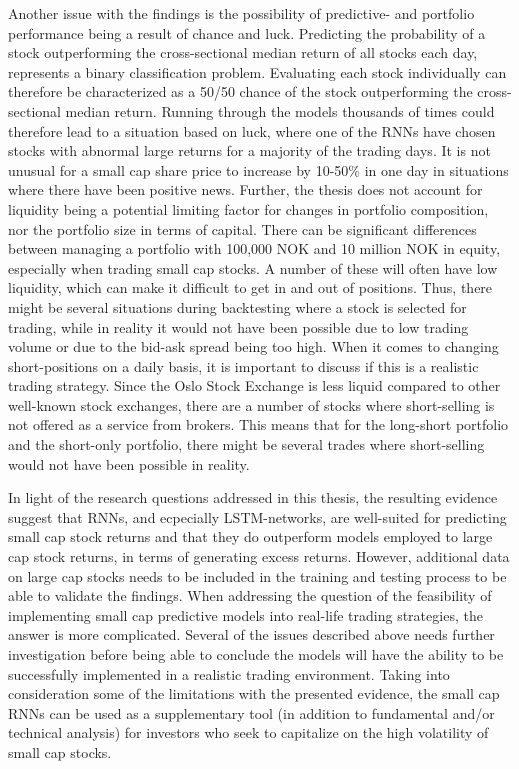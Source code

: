 \indent\newline
Another issue with the findings is the possibility of predictive- and portfolio performance being a result of chance and luck. Predicting the probability of a stock outperforming the cross-sectional median return of all stocks each day, represents a binary classification problem. Evaluating each stock individually can therefore be characterized as a 50/50 chance of the stock outperforming the cross-sectional median return. Running through the models thousands of times could therefore lead to a situation based on luck, where one of the RNNs have chosen stocks with abnormal large returns for a majority of the trading days. It is not unusual for a small cap share price to increase by 10-50\% in one day in situations where there have been positive news. Further, the thesis does not account for liquidity being a potential limiting factor for changes in portfolio composition, nor the portfolio size in terms of capital. There can be significant differences between managing a portfolio with 100,000 NOK and 10 million NOK in equity, especially when trading small cap stocks. A number of these will often have low liquidity, which can make it difficult to get in and out of positions. Thus, there might be several situations during backtesting where a stock is selected for trading, while in reality it would not have been possible due to low trading volume or due to the bid-ask spread being too high. When it comes to changing short-positions on a daily basis, it is important to discuss if this is a realistic trading strategy. Since the Oslo Stock Exchange is less liquid compared to other well-known stock exchanges, there are a number of stocks where short-selling is not offered as a service from brokers. This means that for the long-short portfolio and the short-only portfolio, there might be several trades where short-selling would not have been possible in reality.      

\indent\newline
In light of the research questions addressed in this thesis, the resulting evidence suggest that RNNs, and ecpecially LSTM-networks, are well-suited for predicting small cap stock returns and that they do outperform models employed to large cap stock returns, in terms of generating excess returns. However, additional data on large cap stocks needs to be included in the training and testing process to be able to validate the findings. When addressing the question of the feasibility of implementing small cap predictive models into real-life trading strategies, the answer is more complicated. Several of the issues described above needs further investigation before being able to conclude the models will have the ability to be successfully implemented in a realistic trading environment. Taking into consideration some of the limitations with the presented evidence, the small cap RNNs can be used as a supplementary tool (in addition to fundamental and/or technical analysis) for investors who seek to capitalize on the high volatility of small cap stocks.   

